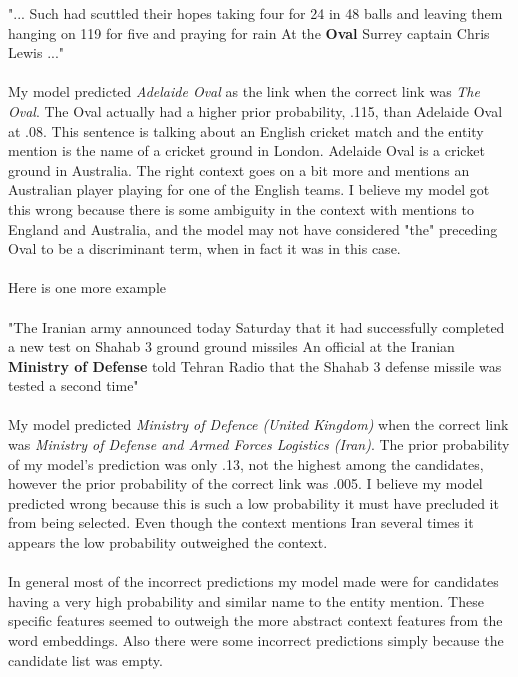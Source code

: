 \documentclass{article}
\begin{document}
"... Such had scuttled their hopes taking four for 24 in 48 balls and leaving them hanging on 119 for five and praying for rain At the \textbf{Oval} Surrey captain Chris Lewis ..."\\\\
My model predicted \textit{Adelaide Oval} as the link when the correct link was \textit{The Oval}.  The Oval actually had a higher prior probability, .115, than Adelaide Oval at .08. This sentence is talking about an English cricket match and the entity mention is the name of a cricket ground in London.  Adelaide Oval is a cricket ground in Australia.  The right context goes on a bit more and mentions an Australian player playing for one of the English teams.  I believe my model got this wrong because there is some ambiguity in the context with mentions to England and Australia, and the model may not have considered "the" preceding Oval to be a discriminant term, when in fact it was in this case.\\\\
Here is one more example\\\\
"The Iranian army announced today Saturday that it had successfully completed a new test on Shahab 3 ground ground missiles An official at the Iranian \textbf{Ministry of Defense} told Tehran Radio that the Shahab 3 defense missile was tested a second time"\\\\
My model predicted \textit{Ministry of Defence (United Kingdom)} when the correct link was \textit{Ministry of Defense and Armed Forces Logistics (Iran)}.  The prior probability of my model's prediction was only .13, not the highest among the candidates, however the prior probability of the correct link was .005.  I believe my model predicted wrong because this is such a low probability it must have precluded it from being selected.  Even though the context mentions Iran several times it appears the low probability outweighed the context.\\\\
In general most of the incorrect predictions my model made were for candidates having a very high probability and similar name to the entity mention.  These specific features seemed to outweigh the more abstract context features from the word embeddings.  Also there were some incorrect predictions simply because the candidate list was empty.
\end{document}
